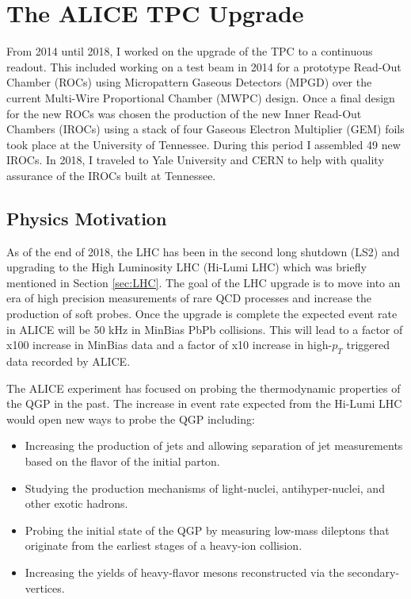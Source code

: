 \chapter{The ALICE TPC Upgrade} \label{ch:tpcu}

From 2014 until 2018, I worked on the upgrade of the TPC to a continuous readout.  This included working on a test beam in 2014 for a prototype Read-Out Chamber (ROCs) using Micropattern Gaseous Detectors (MPGD) over the current Multi-Wire Proportional Chamber (MWPC) design.  Once a final design for the new ROCs was chosen the production of the new Inner Read-Out Chambers (IROCs) using a stack of four Gaseous Electron Multiplier (GEM) foils took place at the University of Tennessee.  During this period I assembled 49 new IROCs.  In 2018, I traveled to Yale University and CERN to help with quality assurance of the IROCs built at Tennessee.


\section{Physics Motivation}
As of the end of 2018, the LHC has been in the second long shutdown (LS2) and upgrading to the High Luminosity LHC (Hi-Lumi LHC)\cite{Apollinari:2015bam} which was briefly mentioned in Section \ref{sec:LHC}.  The goal of the LHC upgrade is to move into an era of high precision measurements of rare QCD processes and increase the production of soft probes.  Once the upgrade is complete the expected event rate in ALICE will be 50 kHz in MinBias PbPb collisions.  This will lead to a factor of x100 increase in MinBias data and a factor of x10 increase in high-$p_{T}$ triggered data recorded by ALICE.

The ALICE experiment has focused on probing the thermodynamic properties of the QGP in the past.  The increase in event rate expected from the Hi-Lumi LHC would open new ways to probe the QGP including\cite{Abelev:1475243}:

\begin{itemize}
\item Increasing the production of jets and allowing separation of jet measurements based on the flavor of the initial parton.
\item Studying the production mechanisms of light-nuclei, antihyper-nuclei, and other exotic hadrons.
\item Probing the initial state of the QGP by measuring low-mass dileptons that originate from the earliest stages of a heavy-ion collision.
\item Increasing the yields of heavy-flavor mesons reconstructed via the secondary-vertices. 
\end{itemize}

